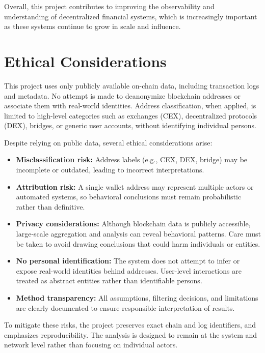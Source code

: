 \documentclass[a4paper,12pt]{report}
\begin{document}
Overall, this project contributes to improving the observability and understanding of decentralized financial systems, which is increasingly important as these systems continue to grow in scale and influence.

\section{Ethical Considerations}

This project uses only publicly available on-chain data, including transaction logs and metadata. No attempt is made to deanonymize blockchain addresses or associate them with real-world identities. Address classification, when applied, is limited to high-level categories such as exchanges (CEX), decentralized protocols (DEX), bridges, or generic user accounts, without identifying individual persons.

Despite relying on public data, several ethical considerations arise:

\begin{itemize}
\item \textbf{Misclassification risk:} Address labels (e.g., CEX, DEX, bridge) may be incomplete or outdated, leading to incorrect interpretations.
\item \textbf{Attribution risk:} A single wallet address may represent multiple actors or automated systems, so behavioral conclusions must remain probabilistic rather than definitive.
\item \textbf{Privacy considerations:} Although blockchain data is publicly accessible, large-scale aggregation and analysis can reveal behavioral patterns. Care must be taken to avoid drawing conclusions that could harm individuals or entities.
\item \textbf{No personal identification:} The system does not attempt to infer or expose real-world identities behind addresses. User-level interactions are treated as abstract entities rather than identifiable persons.
\item \textbf{Method transparency:} All assumptions, filtering decisions, and limitations are clearly documented to ensure responsible interpretation of results.
\end{itemize}

To mitigate these risks, the project preserves exact chain and log identifiers, and emphasizes reproducibility. The analysis is designed to remain at the system and network level rather than focusing on individual actors.
\end{document}

